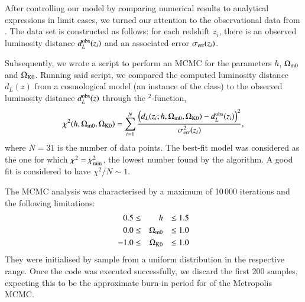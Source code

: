 After controlling our model by comparing numerical results to analytical expressions in limit cases, we turned our attention to the observational data from \citep{supernovadata}. The data set is constructed as follows: for each redshift $z_i$, there is an observed luminosity distance $d_L^\mathrm{obs}(z_i)$ and an associated error $\sigma_\mathrm{err}(z_i)$. %

Subsequently, we wrote a script to perform an MCMC for the parameters $h$, $\Omega_{\mathrm{m}0}$ and $\Omega_{\mathrm{K}0}$. Running said script, we compared the computed luminosity distance $d_L(z)$ from a cosmological model (an instance of the class) to the observed luminosity distance $d_L^\mathrm{obs}(z)$ through the \textchi$^2$-function,
\begin{equation}
    \chi^2(h, \Omega_{\mathrm{m}0}, \Omega_{\mathrm{K}0}) = \sum_{i=1}^N \frac{ \left( d_L(z_i; h, \Omega_{\mathrm{m}0}, \Omega_{\mathrm{K}0}) - d_L^\mathrm{obs}(z_i)\right)^2 }{\sigma_\mathrm{err}^2(z_i)},
\end{equation}
where $N=31$ is the number of data points. The best-fit model was considered as the one for which $\chi^2 = \chi^2_\mathrm{min}$, the lowest number found by the algorithm. A good fit is considered to have $\chi^2/N \sim 1$. 

The MCMC analysis was characterised by a maximum of 10\,000 iterations and the following limitations:
\begin{equation}\label{mil1:imp:eq:mcmc_limits}
    \begin{split}
        0.5 \leq&& h &&\leq 1.5 \\
        0.0 \leq&& \Omega_{\mathrm{m}0} &&\leq 1.0 \\
        -1.0 \leq&& \Omega_{\mathrm{K}0} &&\leq 1.0 
    \end{split}
\end{equation}
They were initialised by sample from a uniform distribution in the respective range. Once the code was executed successfully, we discard the first 200 samples, expecting this to be the approximate burn-in period for of the Metropolis MCMC.
